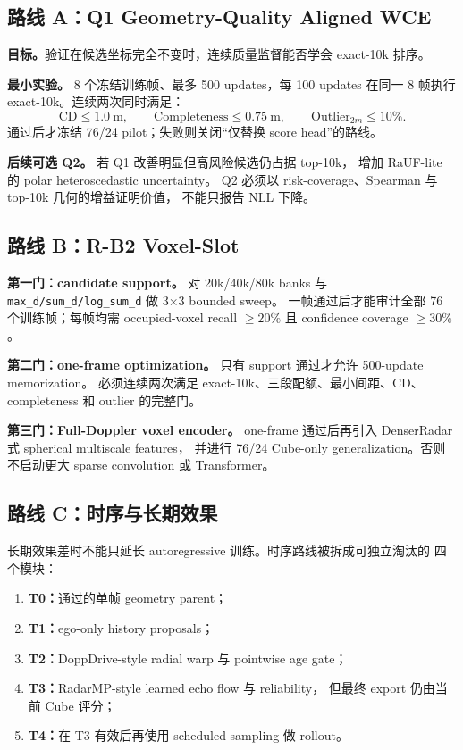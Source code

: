 \documentclass[11pt,a4paper,fontset=none]{ctexart}
\newcommand{\code}[1]{\texttt{#1}}
\begin{document}
\subsection{路线 A：Q1 Geometry-Quality Aligned WCE}

\textbf{目标。}验证在候选坐标完全不变时，连续质量监督能否学会 exact-10k
排序。

\textbf{最小实验。}
8 个冻结训练帧、最多 500 updates，每 100 updates 在同一 8 帧执行
exact-10k。连续两次同时满足：
\begin{equation}
  \mathrm{CD}\le1.0\ \mathrm m,\qquad
  \mathrm{Completeness}\le0.75\ \mathrm m,\qquad
  \mathrm{Outlier}_{2m}\le10\%.
\end{equation}
通过后才冻结 76/24 pilot；失败则关闭“仅替换 score head”的路线。

\textbf{后续可选 Q2。}
若 Q1 改善明显但高风险候选仍占据 top-10k，
增加 RaUF-lite 的 polar heteroscedastic uncertainty。
Q2 必须以 risk-coverage、Spearman 与 top-10k 几何的增益证明价值，
不能只报告 NLL 下降。

\subsection{路线 B：R-B2 Voxel-Slot}

\textbf{第一门：candidate support。}
对 20k/40k/80k banks 与
\code{max\_d/sum\_d/log\_sum\_d} 做 3$\times$3 bounded sweep。
一帧通过后才能审计全部 76 个训练帧；每帧均需
occupied-voxel recall $\ge20\%$ 且 confidence coverage $\ge30\%$。

\textbf{第二门：one-frame optimization。}
只有 support 通过才允许 500-update memorization。
必须连续两次满足 exact-10k、三段配额、最小间距、CD、completeness
和 outlier 的完整门。

\textbf{第三门：Full-Doppler voxel encoder。}
one-frame 通过后再引入 DenserRadar 式 spherical multiscale features，
并进行 76/24 Cube-only generalization。否则不启动更大 sparse convolution
或 Transformer。

\subsection{路线 C：时序与长期效果}

长期效果差时不能只延长 autoregressive 训练。时序路线被拆成可独立淘汰的
四个模块：
\begin{enumerate}
  \item \textbf{T0：}通过的单帧 geometry parent；
  \item \textbf{T1：}ego-only history proposals；
  \item \textbf{T2：}DoppDrive-style radial warp 与 pointwise age gate；
  \item \textbf{T3：}RadarMP-style learned echo flow 与 reliability，
  但最终 export 仍由当前 Cube 评分；
  \item \textbf{T4：}在 T3 有效后再使用 scheduled sampling 做 rollout。
\end{enumerate}
\end{document}
